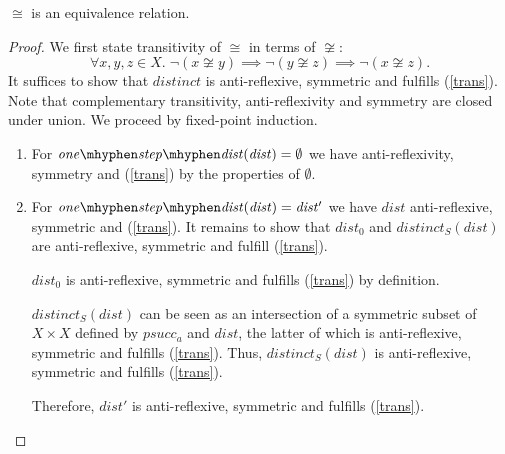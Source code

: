 \begin{lemma}
    \label{equiv_equiv}
    $\cong$ is an equivalence relation.
\end{lemma}
\begin{proof}
    We first state transitivity of $\cong$ in terms of $\not\cong$:%
    \begin{equation}
        \tag{*}
        \label{trans}
        \forall x,y,z \in X. \; \neg (x \not\cong y) \implies \neg (y \not\cong z) \implies \neg (x \not\cong z).
    \end{equation}
    It suffices to show that $\mathit{distinct}$ is anti-reflexive, symmetric and fulfills (\ref{trans}).
    Note that complementary transitivity, anti-reflexivity and symmetry are closed under union.
    We proceed by fixed-point induction.
    \begin{enumerate}
        \item For $\mathit{one\mhyphen step\mhyphen dist}(\mathit{dist}) = \emptyset$ we have anti-reflexivity, symmetry and (\ref{trans}) %
            by the properties of $\emptyset$.
        \item For $\mathit{one\mhyphen step\mhyphen dist}(\mathit{dist}) = \mathit{dist'}$ 
            we have $\mathit{dist}$ anti-reflexive, symmetric and (\ref{trans}). %
            It remains to show that
            $\mathit{dist_0}$ 
            and $\mathit{distinct_S}(\mathit{dist})$ 
            are anti-reflexive, symmetric and fulfill (\ref{trans}). 
            
            $\mathit{dist_0}$ is anti-reflexive, symmetric and fulfills (\ref{trans})  by definition. 

            $\mathit{distinct_S}(\mathit{dist})$ can be seen as an intersection 
            of a symmetric subset of $X \times X$ defined by $\mathit{psucc_a}$ and  $\mathit{dist}$, 
            the latter of which is anti-reflexive, symmetric and fulfills (\ref{trans}).
            Thus, $\mathit{distinct_S}(\mathit{dist})$ is anti-reflexive, symmetric and fulfills (\ref{trans}). %
            
            Therefore, $\mathit{dist'}$ is anti-reflexive, symmetric and fulfills (\ref{trans}). %
    \end{enumerate}
\end{proof}


